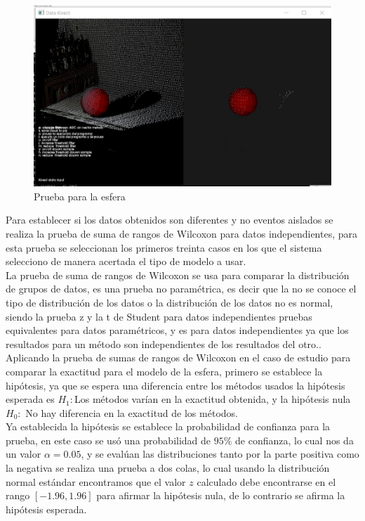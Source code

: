 	
	\begin{figure}[!htb] 
		\centering
		\includegraphics[width=1\textwidth]{03Resultados/imagenes/esfera.JPG}
		\caption{Prueba para la esfera} 
		\label{fig:pruebaEsf}
	\end{figure}
	
	
	Para establecer si los datos obtenidos son diferentes y no eventos aislados se realiza la prueba de suma de rangos de Wilcoxon para datos independientes, para esta prueba se seleccionan los primeros treinta casos en los que el sistema selecciono de manera acertada el tipo de modelo a usar. \\
	
	La prueba de suma de rangos de Wilcoxon se usa para comparar la distribución de grupos de datos, es una prueba no paramétrica, es decir que la no se conoce el tipo de distribución de los datos o la distribución de los datos no es normal, siendo la prueba z y la t de Student para datos independientes pruebas equivalentes para datos paramétricos, y es para datos independientes ya que los resultados para un método son independientes de los resultados del otro.\cite{bluman2009elementary}.\\
	
	Aplicando la prueba de sumas de rangos de Wilcoxon en el caso de estudio para comparar la exactitud para el modelo de la esfera, primero se establece la hipótesis, ya que se espera una diferencia entre los métodos usados la hipótesis esperada es $H_1:$Los métodos varían en la exactitud obtenida, y la hipótesis nula $H_0:$ No hay diferencia en la exactitud de los métodos.\\
	
	Ya establecida la hipótesis se establece la probabilidad de confianza para la prueba, en este caso se usó una probabilidad de $95\%$ de confianza, lo cual nos da un valor $\alpha=0.05$, y se evalúan las distribuciones tanto por la parte positiva como la negativa se realiza una prueba a dos colas, lo cual usando la distribución normal estándar encontramos que el valor $z$ calculado debe encontrarse en el rango $[-1.96,1.96]$ para afirmar la hipótesis nula, de lo contrario se afirma la hipótesis esperada.\\
	
